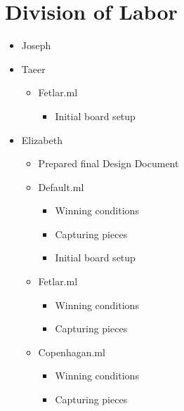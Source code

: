 \documentclass[11pt, oneside]{article}
\begin{document}
\section{Division of Labor}
\begin{itemize}
\item Joseph
\item Taeer
  \begin{itemize}
  \item Fetlar.ml
    \begin{itemize}
    \item Initial board setup
    \end{itemize}
  \end{itemize}
\item Elizabeth
  \begin{itemize}
  \item Prepared final Design Document
  \item Default.ml
    \begin{itemize}
    \item Winning conditions
    \item Capturing pieces
    \item Initial board setup
    \end{itemize}
  \item Fetlar.ml
    \begin{itemize}
    \item Winning conditions
    \item Capturing pieces
    \end{itemize}
  \item Copenhagan.ml
    \begin{itemize}
    \item Winning conditions
    \item Capturing pieces
    \end{itemize}
  \end{itemize}
\end{itemize}
\end{document}
